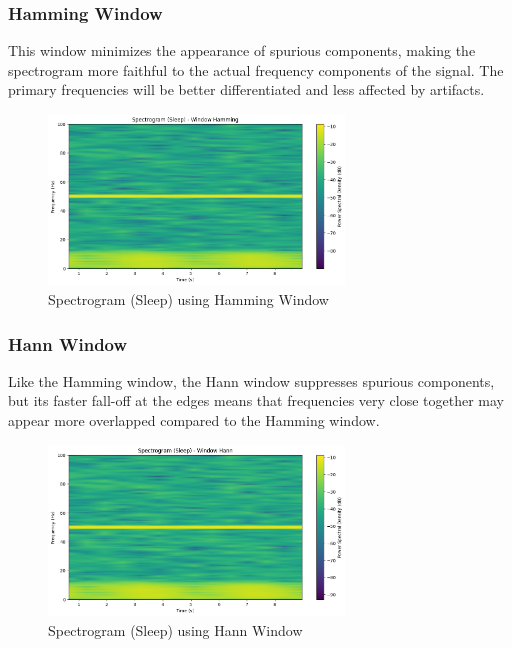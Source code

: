 \documentclass[10pt]{article}
\theoremstyle{definition}
\theoremstyle{remark}
\theoremstyle{definition}
\numberwithin{equation}{prob}
\begin{document}
\subsubsection{Hamming Window}
This window minimizes the appearance of spurious components, making the spectrogram more faithful to the actual frequency components of the signal. The primary frequencies will be better differentiated and less affected by artifacts.

\begin{figure}[H]
    \centering
    \includegraphics[width=0.7\textwidth]{./figures/Spectrogram (Sleep) - Window Hamming.png}
    \caption{Spectrogram (Sleep) using Hamming Window}
\end{figure}

\subsubsection{Hann Window}
Like the Hamming window, the Hann window suppresses spurious components, but its faster fall-off at the edges means that frequencies very close together may appear more overlapped compared to the Hamming window.

\begin{figure}[H]
    \centering
    \includegraphics[width=0.7\textwidth]{./figures/Spectrogram (Sleep) - Window Hann.png}
    \caption{Spectrogram (Sleep) using Hann Window}
\end{figure}
\end{document}

